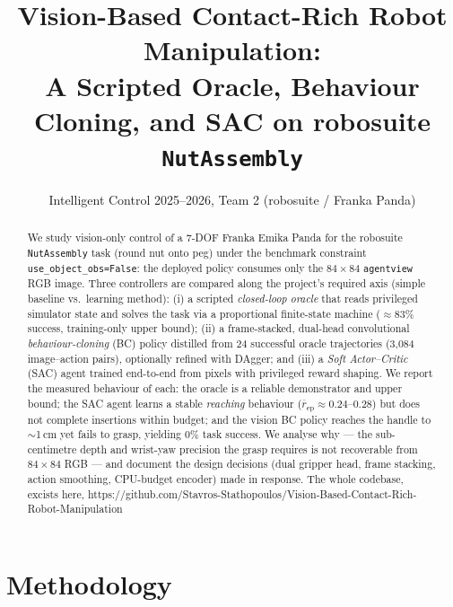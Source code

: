 \documentclass[10pt]{article}
\title{\vspace{-3.0em}\textbf{Vision-Based Contact-Rich Robot Manipulation:\\
A Scripted Oracle, Behaviour Cloning, and SAC on robosuite \texttt{NutAssembly}}}
\author{\normalsize Intelligent Control 2025--2026, Team 2 \quad(robosuite / Franka Panda)}
\date{\vspace{-1.2em}}
\newcommand{\code}[1]{\texttt{\small #1}}
\begin{document}
\maketitle

\begin{abstract}
\noindent We study vision-only control of a 7-DOF Franka Emika Panda for the
robosuite \code{NutAssembly} task (round nut onto peg) under the benchmark
constraint \code{use\_object\_obs=False}: the deployed policy consumes only the
$84{\times}84$ \code{agentview} RGB image. Three controllers are compared along
the project's required axis (simple baseline vs.\ learning method): (i) a scripted
\emph{closed-loop oracle} that reads privileged simulator state and solves the
task via a proportional finite-state machine ($\approx$83\% success, training-only
upper bound); (ii) a frame-stacked, dual-head convolutional \emph{behaviour-cloning}
(BC) policy distilled from 24 successful oracle trajectories (3{,}084 image--action
pairs), optionally refined with DAgger; and (iii) a \emph{Soft Actor--Critic}
(SAC) agent trained end-to-end from pixels with privileged reward shaping. We
report the measured behaviour of each: the oracle is a reliable demonstrator and
upper bound; the SAC agent learns a stable \emph{reaching} behaviour
($\overline{r}_{\text{ep}}\!\approx\!0.24\text{--}0.28$) but does not complete
insertions within budget; and the vision BC policy reaches the handle to
$\sim$1\,cm yet fails to grasp, yielding 0\% task success. We analyse why --- the
sub-centimetre depth and wrist-yaw precision the grasp requires is not recoverable
from $84{\times}84$ RGB --- and document the design decisions (dual gripper head,
frame stacking, action smoothing, CPU-budget encoder) made in response.
The whole codebase, excists here, https://github.com/Stavros-Stathopoulos/Vision-Based-Contact-Rich-Robot-Manipulation
\end{abstract}

\section{Methodology}
\end{document}

